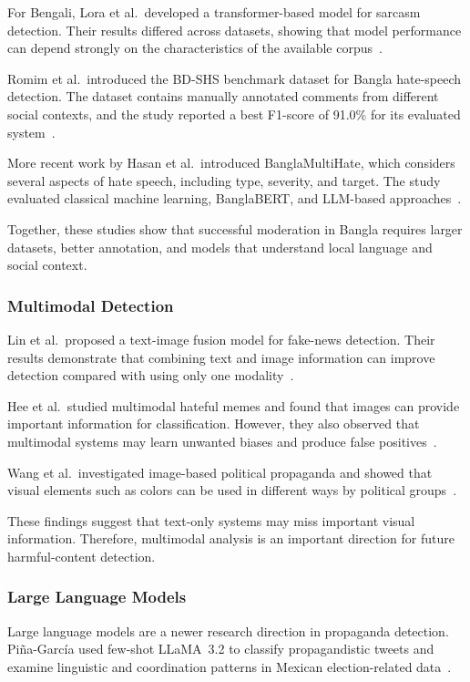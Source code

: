 \documentclass[12pt,a4paper]{report}
\begin{document}
For Bengali, Lora et al.\ developed a transformer-based model for sarcasm
detection. Their results differed across datasets, showing that model performance
can depend strongly on the characteristics of the available corpus~\cite{lora2023}.

Romim et al.\ introduced the BD-SHS benchmark dataset for Bangla hate-speech
detection. The dataset contains manually annotated comments from different social
contexts, and the study reported a best F1-score of 91.0\% for its evaluated
system~\cite{romim2022}.

More recent work by Hasan et al.\ introduced BanglaMultiHate, which considers
several aspects of hate speech, including type, severity, and target. The study
evaluated classical machine learning, BanglaBERT, and LLM-based
approaches~\cite{hasan2026}.

Together, these studies show that successful moderation in Bangla requires larger
datasets, better annotation, and models that understand local language and social
context.

\subsubsection*{Multimodal Detection}
Lin et al.\ proposed a text-image fusion model for fake-news detection. Their
results demonstrate that combining text and image information can improve detection
compared with using only one modality~\cite{lin2024}.

Hee et al.\ studied multimodal hateful memes and found that images can provide
important information for classification. However, they also observed that
multimodal systems may learn unwanted biases and produce false
positives~\cite{hee2022}.

Wang et al.\ investigated image-based political propaganda and showed that visual
elements such as colors can be used in different ways by political
groups~\cite{wang2022}.

These findings suggest that text-only systems may miss important visual
information. Therefore, multimodal analysis is an important direction for future
harmful-content detection.

\subsubsection*{Large Language Models}
Large language models are a newer research direction in propaganda detection.
Pi\~na-Garc\'ia used few-shot LLaMA~3.2 to classify propagandistic tweets and
examine linguistic and coordination patterns in Mexican election-related
data~\cite{pina2025}.
\end{document}
